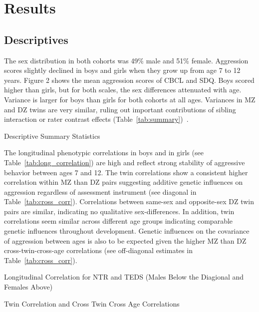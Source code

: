 ﻿\section{Results}
\subsection{Descriptives}
The sex distribution in both cohorts was 49\% male and 51\% female.
Aggression scores slightly declined in boys and girls when they grow up from age 7 to 12 years.
Figure 2 shows the mean aggression scores of CBCL and SDQ\@.
Boys scored higher than girls, but for both scales, the sex differences attenuated with age.
Variance is larger for boys than girls for both cohorts at all ages.
Variances in MZ and DZ twins are very similar, ruling out important contributions of sibling interaction or rater contrast effects (Table~\ref{tab:summary})~\cite{Eaves1978, Boomsma2014}.
\begin{table}[hbt]
  \centering
  \caption{Descriptive Summary Statistics}\label{tab:summary}
\end{table}
The longitudinal phenotypic correlations in boys and in girls (see Table~\ref{tab:long_correlation}) are high and reflect strong stability of aggressive behavior between ages 7 and 12.
The twin correlations show a consistent higher correlation within MZ than DZ pairs suggesting additive genetic influences on aggression regardless of assessment instrument (see diagonal in Table~\ref{tab:cross_corr}).
Correlations between same-sex and opposite-sex DZ twin pairs are similar, indicating no qualitative sex-differences.
In addition, twin correlations seem similar across different age groups indicating comparable genetic influences throughout development.
Genetic influences on the covariance of aggression between ages is also to be expected given the higher MZ than DZ cross-twin-cross-age correlations (see off-diagonal estimates in Table~\ref{tab:cross_corr}). 

\begin{table}
  \centering
  
	\caption{Longitudinal Correlation for NTR and TEDS (Males Below the Diagional and Females Above)}\label{tab:long_correlation}
\end{table}

\begin{landscape}
\begin{table}
  \centering
  \caption{Twin Correlation and Cross Twin Cross Age Correlations}\label{tab:cross_corr}
\end{table}
\end{landscape}
